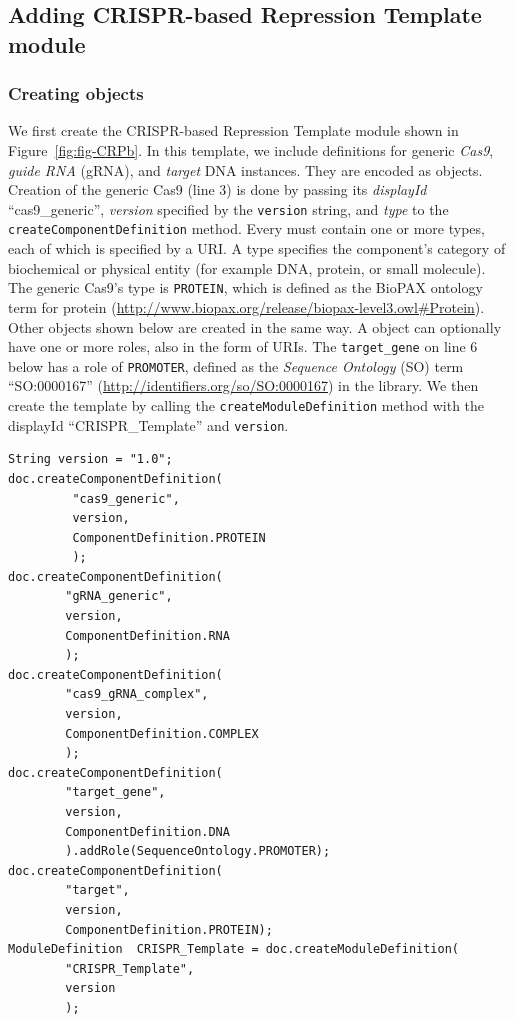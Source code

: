 \subsection*{Adding CRISPR-based Repression Template module}
\subsubsection*{Creating  objects}
We first create the CRISPR-based Repression Template module shown in Figure~\ref{fig:fig-CRPb}. In this template, we include definitions for generic \emph{Cas9}, \emph{guide RNA} (gRNA), and \emph{target} DNA  instances. They are encoded as  objects. Creation of the generic Cas9 (line 3)  is done by passing its \emph{displayId} ``cas9\_generic'', \emph{version} specified by the \lstinline+version+ string, and \emph{type} to the \lstinline+createComponentDefinition+ method. Every  must contain one or more types, each of which is specified by a URI. A type specifies the component's category of biochemical or physical entity (for example DNA, protein, or small molecule). The generic Cas9's type is \lstinline+PROTEIN+, which is defined as the BioPAX ontology term for protein (\url{http://www.biopax.org/release/biopax-level3.owl\#Protein}). Other  objects shown below are created in the same way. A  object can optionally have one or more roles, also in the form of URIs. The \lstinline+target_gene+ on line 6 below has a role of \lstinline+PROMOTER+, defined as the \emph{Sequence Ontology} (SO) term ``SO:0000167'' (\url{http://identifiers.org/so/SO:0000167}) in the library.  We then create the  template by calling the \lstinline+createModuleDefinition+ method with the displayId ``CRISPR\_Template'' and \lstinline+version+. 

\vspace{\abovedisplayskip}
\begin{minipage}{0.95\textwidth} 
\begin{lstlisting}
String version = "1.0";
doc.createComponentDefinition(
         "cas9_generic", 
         version, 
         ComponentDefinition.PROTEIN
         );
doc.createComponentDefinition(
        "gRNA_generic",
        version, 
        ComponentDefinition.RNA
        );
doc.createComponentDefinition(
        "cas9_gRNA_complex",
        version, 
        ComponentDefinition.COMPLEX
        );
doc.createComponentDefinition(
        "target_gene",
        version, 
        ComponentDefinition.DNA
        ).addRole(SequenceOntology.PROMOTER);
doc.createComponentDefinition(
        "target",
        version, 
        ComponentDefinition.PROTEIN);
ModuleDefinition  CRISPR_Template = doc.createModuleDefinition(
        "CRISPR_Template", 
        version
        );
\end{lstlisting}
\end{minipage}

